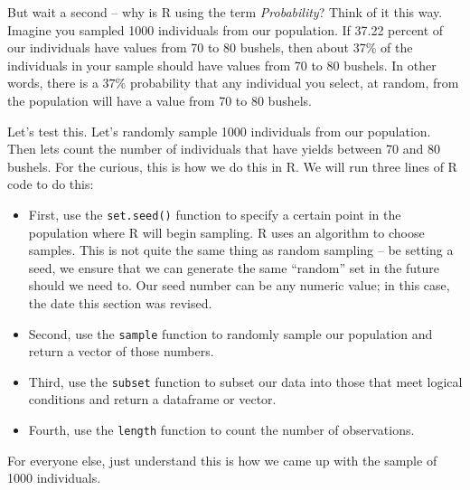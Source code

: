 \documentclass[
]{book}
\newenvironment{Shaded}{\begin{snugshade}}{\end{snugshade}}
\newcommand{\CommentTok}[1]{\textcolor[rgb]{0.56,0.35,0.01}{\textit{#1}}}
\newcommand{\DecValTok}[1]{\textcolor[rgb]{0.00,0.00,0.81}{#1}}
\newcommand{\FunctionTok}[1]{\textcolor[rgb]{0.00,0.00,0.00}{#1}}
\newcommand{\NormalTok}[1]{#1}
\newcommand{\OtherTok}[1]{\textcolor[rgb]{0.56,0.35,0.01}{#1}}
\newcommand{\SpecialCharTok}[1]{\textcolor[rgb]{0.00,0.00,0.00}{#1}}
\begin{document}
But wait a second -- why is R using the term \emph{Probability}? Think of it this way. Imagine you sampled 1000 individuals from our population. If 37.22 percent of our individuals have values from 70 to 80 bushels, then about 37\% of the individuals in your sample should have values from 70 to 80 bushels. In other words, there is a 37\% probability that any individual you select, at random, from the population will have a value from 70 to 80 bushels.

Let's test this. Let's randomly sample 1000 individuals from our population. Then lets count the number of individuals that have yields between 70 and 80 bushels. For the curious, this is how we do this in R. We will run three lines of R code to do this:

\begin{itemize}
\item
  First, use the \texttt{set.seed()} function to specify a certain point in the population where R will begin sampling. R uses an algorithm to choose samples. This is not quite the same thing as random sampling -- be setting a seed, we ensure that we can generate the same ``random'' set in the future should we need to. Our seed number can be any numeric value; in this case, the date this section was revised.
\item
  Second, use the \texttt{sample} function to randomly sample our population and return a vector of those numbers.
\item
  Third, use the \texttt{subset} function to subset our data into those that meet logical conditions and return a dataframe or vector.
\item
  Fourth, use the \texttt{length} function to count the number of observations.
\end{itemize}

For everyone else, just understand this is how we came up with the sample of 1000 individuals.

\begin{Shaded}
\end{Shaded}
\end{document}
